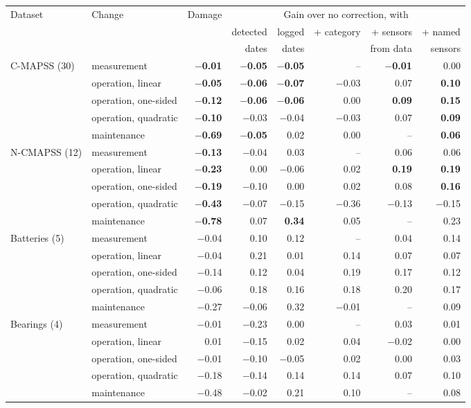 \begin{tabular}{@{}llrrrrrr@{}}
\toprule
Dataset & Change & Damage & \multicolumn{5}{c}{Gain over no correction, with} \\
\cmidrule(l){4-8}
 & & & detected & logged & + category & + sensors & + named \\
 & & & dates & dates & & from data & sensors \\
\midrule
C-MAPSS (30) & measurement & \textbf{$-$0.01} & \textbf{$-$0.05} & \textbf{$-$0.05} & -- & \textbf{$-$0.01} & 0.00 \\
 & operation, linear & \textbf{$-$0.05} & \textbf{$-$0.06} & \textbf{$-$0.07} & $-$0.03 & 0.07 & \textbf{0.10} \\
 & operation, one-sided & \textbf{$-$0.12} & \textbf{$-$0.06} & \textbf{$-$0.06} & 0.00 & \textbf{0.09} & \textbf{0.15} \\
 & operation, quadratic & \textbf{$-$0.10} & $-$0.03 & $-$0.04 & $-$0.03 & 0.07 & \textbf{0.09} \\
 & maintenance & \textbf{$-$0.69} & \textbf{$-$0.05} & 0.02 & 0.00 & -- & \textbf{0.06} \\
\midrule
N-CMAPSS (12) & measurement & \textbf{$-$0.13} & $-$0.04 & 0.03 & -- & 0.06 & 0.06 \\
 & operation, linear & \textbf{$-$0.23} & 0.00 & $-$0.06 & 0.02 & \textbf{0.19} & \textbf{0.19} \\
 & operation, one-sided & \textbf{$-$0.19} & $-$0.10 & 0.00 & 0.02 & 0.08 & \textbf{0.16} \\
 & operation, quadratic & \textbf{$-$0.43} & $-$0.07 & $-$0.15 & $-$0.36 & $-$0.13 & $-$0.15 \\
 & maintenance & \textbf{$-$0.78} & 0.07 & \textbf{0.34} & 0.05 & -- & 0.23 \\
\midrule
Batteries (5) & measurement & $-$0.04 & 0.10 & 0.12 & -- & 0.04 & 0.14 \\
 & operation, linear & $-$0.04 & 0.21 & 0.01 & 0.14 & 0.07 & 0.07 \\
 & operation, one-sided & $-$0.14 & 0.12 & 0.04 & 0.19 & 0.17 & 0.12 \\
 & operation, quadratic & $-$0.06 & 0.18 & 0.16 & 0.18 & 0.20 & 0.17 \\
 & maintenance & $-$0.27 & $-$0.06 & 0.32 & $-$0.01 & -- & 0.09 \\
\midrule
Bearings (4) & measurement & $-$0.01 & $-$0.23 & 0.00 & -- & 0.03 & 0.01 \\
 & operation, linear & 0.01 & $-$0.15 & 0.02 & 0.04 & $-$0.02 & 0.00 \\
 & operation, one-sided & $-$0.01 & $-$0.10 & $-$0.05 & 0.02 & 0.00 & 0.03 \\
 & operation, quadratic & $-$0.18 & $-$0.14 & 0.14 & 0.14 & 0.07 & 0.10 \\
 & maintenance & $-$0.48 & $-$0.02 & 0.21 & 0.10 & -- & 0.08 \\
\bottomrule
\end{tabular}
